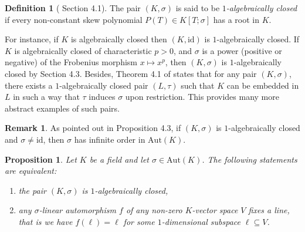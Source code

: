 \documentclass[12pt]{amsart}
\newtheorem{proposition}[theorem]{Proposition}
\theoremstyle{definition}
\newtheorem{definition}[theorem]{Definition}
\newtheorem{remark}[theorem]{Remark}
\newcommand{\<}{\langle}   %
\renewcommand{\>}{\rangle} %
\begin{document}
\begin{definition}[\cite{aryapoor:2024} Section 4.1]
    The pair $(K,\sigma)$ is said to be \textit{$1$-algebraically closed} if every non-constant skew polynomial $P(T) \in K[T;\sigma]$ has a root in $K$.
\end{definition}

For instance, if $K$ is algebraically closed then $(K,\mathrm{id})$ is $1$-algebraically closed. If $K$ is algebraically closed of characteristic $p>0$, and $\sigma$ is a power (positive or negative) of the Frobenius morphism $x \mapsto x^p$, then $(K,\sigma)$ is $1$-algebraically closed by \cite{aryapoor:2024} Section 4.3. Besides, Theorem 4.1 of \cite{aryapoor:2024} states that for any pair $(K,\sigma)$, there exists a $1$-algebraically closed pair $(L,\tau)$ such that $K$ can be embedded in $L$ in such a way that $\tau$ induces $\sigma$ upon restriction. This provides many more abstract examples of such pairs. 

\begin{remark}
    As pointed out in \cite{aryapoor:2024} Proposition 4.3, if $(K,\sigma)$ is $1$-algebraically closed and $\sigma \not = \mathrm{id}$, then $\sigma$ has infinite order in $\mathrm{Aut}(K)$.
\end{remark}

\begin{proposition}\label{Equivalence1-algebraicallyclosed}
    Let $K$ be a field and let $\sigma \in \mathrm{Aut}(K)$. The following statements are equivalent:
    \begin{enumerate}
        \item the pair $(K,\sigma)$ is $1$-algebraically closed,\\
        \item any $\sigma$-linear automorphism $f$ of any non-zero $K$-vector space $V$ fixes a line, that is we have $f(\ell) = \ell$ for some $1$-dimensional subspace $\ell \subseteq V$.
    \end{enumerate}
\end{proposition}
\end{document}
